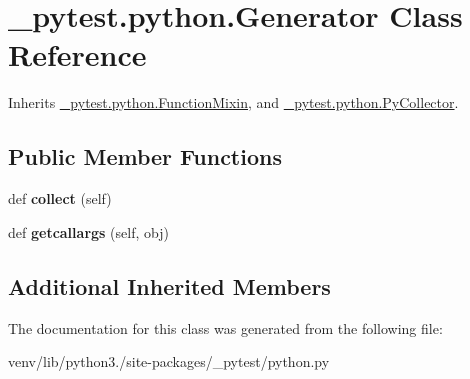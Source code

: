 \hypertarget{class__pytest_1_1python_1_1_generator}{}\section{\+\_\+pytest.\+python.\+Generator Class Reference}
\label{class__pytest_1_1python_1_1_generator}


Inherits \hyperlink{class__pytest_1_1python_1_1_function_mixin}{\+\_\+pytest.\+python.\+Function\+Mixin}, and \hyperlink{class__pytest_1_1python_1_1_py_collector}{\+\_\+pytest.\+python.\+Py\+Collector}.

\subsection*{Public Member Functions}
\begin{DoxyCompactItemize}
\item 
\mbox{\label{class__pytest_1_1python_1_1_generator_a82484e0af749b362519919b17972d2e3}} 
def {\bfseries collect} (self)
\item 
\mbox{\label{class__pytest_1_1python_1_1_generator_a2ce99988ca35ec95e07974c5adedaa77}} 
def {\bfseries getcallargs} (self, obj)
\end{DoxyCompactItemize}
\subsection*{Additional Inherited Members}


The documentation for this class was generated from the following file\+:\begin{DoxyCompactItemize}
\item 
venv/lib/python3./site-\/packages/\+\_\+pytest/python.\+py\end{DoxyCompactItemize}
